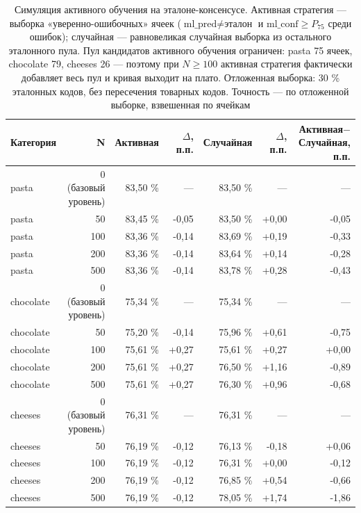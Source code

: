 \begin{table}[h!]
\centering
\caption{Симуляция активного обучения на эталоне-консенсусе. Активная стратегия --- выборка «уверенно-ошибочных» ячеек ($\text{ml\_pred} \ne \text{эталон}$ и $\text{ml\_conf} \ge P_{75}$ среди ошибок); случайная --- равновеликая случайная выборка из остального эталонного пула. Пул кандидатов активного обучения ограничен: pasta 75 ячеек, chocolate 79, cheeses 26 --- поэтому при $N \ge 100$ активная стратегия фактически добавляет весь пул и кривая выходит на плато. Отложенная выборка: 30 \% эталонных кодов, без пересечения товарных кодов. Точность --- по отложенной выборке, взвешенная по ячейкам}
\label{tab:active_learning}
\begin{tabular}{lrrrrrr}
\toprule
Категория & N & Активная & $\Delta$, п.п. & Случайная & $\Delta$, п.п. & Активная$-$Случайная, п.п. \\
\midrule
pasta & 0 (базовый уровень) & 83,50 \% & --- & 83,50 \% & --- & --- \\
pasta & 50 & 83,45 \% & -0,05 & 83,50 \% & +0,00 & -0,05 \\
pasta & 100 & 83,36 \% & -0,14 & 83,69 \% & +0,19 & -0,33 \\
pasta & 200 & 83,36 \% & -0,14 & 83,64 \% & +0,14 & -0,28 \\
pasta & 500 & 83,36 \% & -0,14 & 83,78 \% & +0,28 & -0,43 \\
chocolate & 0 (базовый уровень) & 75,34 \% & --- & 75,34 \% & --- & --- \\
chocolate & 50 & 75,20 \% & -0,14 & 75,96 \% & +0,61 & -0,75 \\
chocolate & 100 & 75,61 \% & +0,27 & 75,61 \% & +0,27 & +0,00 \\
chocolate & 200 & 75,61 \% & +0,27 & 76,50 \% & +1,16 & -0,89 \\
chocolate & 500 & 75,61 \% & +0,27 & 76,30 \% & +0,96 & -0,68 \\
cheeses & 0 (базовый уровень) & 76,31 \% & --- & 76,31 \% & --- & --- \\
cheeses & 50 & 76,19 \% & -0,12 & 76,13 \% & -0,18 & +0,06 \\
cheeses & 100 & 76,19 \% & -0,12 & 76,31 \% & +0,00 & -0,12 \\
cheeses & 200 & 76,19 \% & -0,12 & 76,85 \% & +0,54 & -0,66 \\
cheeses & 500 & 76,19 \% & -0,12 & 78,05 \% & +1,74 & -1,86 \\
\bottomrule
\end{tabular}
\end{table}
